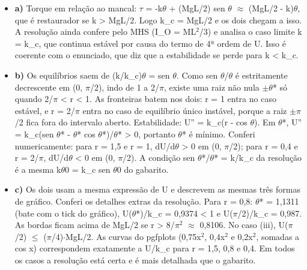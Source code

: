 \documentclass{article}%
\begin{document}
\begin{itemize}%
\item%
\textbf{a)} Torque em relação ao mancal: $\tau$ = -k$\theta$ + (MgL/2) sen $\theta$ $\approx$ (MgL/2 - k)$\theta$, que é restaurador se k > MgL/2. Logo k\_c = MgL/2 e os dois chegam a isso. A resolução ainda confere pelo MHS (I\_O = ML$^2$/3) e analisa o caso limite k = k\_c, que continua estável por causa do termo de 4ª ordem de U. Isso é coerente com o enunciado, que diz que a estabilidade se perde para k < k\_c.%
\item%
\textbf{b)} Os equilíbrios saem de (k/k\_c)$\theta$ = sen $\theta$. Como sen $\theta$/$\theta$ é estritamente decrescente em (0, $\pi$/2), indo de 1 a 2/$\pi$, existe uma raiz não nula $\pm$$\theta$* só quando 2/$\pi$ < r < 1. As fronteiras batem nos dois: r = 1 entra no caso estável, e r = 2/$\pi$ entra no caso de equilíbrio único instável, porque a raiz $\pm$$\pi$/2 fica fora do intervalo aberto. Estabilidade: U'' = k\_c(r - cos $\theta$). Em $\theta$*, U'' = k\_c(sen $\theta$* - $\theta$* cos $\theta$*)/$\theta$* > 0, portanto $\theta$* é mínimo. Conferi numericamente: para r = 1,5 e r = 1, dU/d$\theta$ > 0 em (0, $\pi$/2); para r = 0,4 e r = 2/$\pi$, dU/d$\theta$ < 0 em (0, $\pi$/2). A condição sen $\theta$*/$\theta$* = k/k\_c da resolução é a mesma k$\theta$0 = k\_c sen $\theta$0 do gabarito.%
\item%
\textbf{c)} Os dois usam a mesma expressão de U e descrevem as mesmas três formas de gráfico. Conferi os detalhes extras da resolução. Para r = 0,8: $\theta$* = 1,1311 (bate com o tick do gráfico), U($\theta$*)/k\_c = 0,9374 < 1 e U($\pi$/2)/k\_c = 0,987. As bordas ficam acima de MgL/2 se r > 8/$\pi$$^2$ $\approx$ 0,8106. No caso (iii), U($\pi$/2) $\leq$ ($\pi$/4)$\cdot$MgL/2. As curvas do pgfplots (0,75x$^2$, 0,4x$^2$ e 0,2x$^2$, somadas a cos x) correspondem exatamente a U/k\_c para r = 1,5, 0,8 e 0,4. Em todos os casos a resolução está certa e é mais detalhada que o gabarito.%
\end{itemize}%
\end{document}
